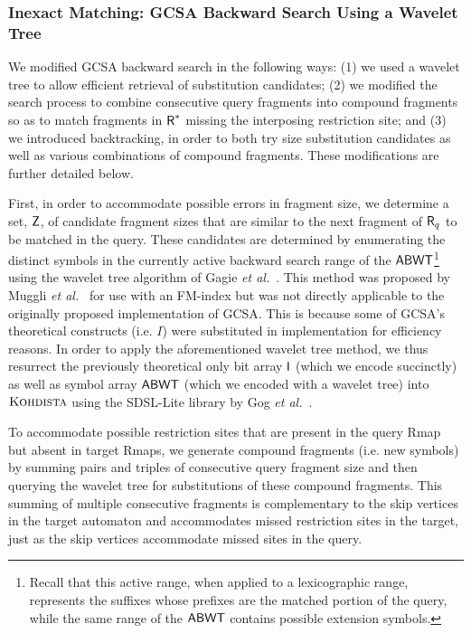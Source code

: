 \subsubsection{Inexact Matching: GCSA Backward Search Using a Wavelet Tree}



We modified GCSA backward search in the following ways:
(1) we used a wavelet tree to allow efficient retrieval of substitution candidates; (2) we modified the search process to combine consecutive query fragments into compound fragments so as to match fragments in $\mbox{\rm {\sf R}}^*$ missing the interposing restriction site; and (3) we introduced backtracking, in order to both try size substitution candidates as well as various combinations of compound fragments. These modifications are further detailed below.

First, in order to accommodate possible errors in fragment size, we determine a set, $\mathsf{Z}$, of candidate fragment sizes that are similar to the next fragment of $\mbox{\rm {\sf R}}_q$ to be matched in the query. These candidates are determined by enumerating the distinct symbols in the currently active backward search range of the $\mbox{\rm {\sf ABWT}}$\footnote{Recall that this active range, when applied to a lexicographic range, represents the suffixes whose prefixes are the matched portion of the query, while the same range of the $\mbox{\rm {\sf ABWT}}$ contains possible extension symbols.} using the wavelet tree algorithm of Gagie {\it et al.}~\cite{GNPtcs11}.  This method was proposed by Muggli {\it et al.}~\cite{wabi2014} for use with an FM-index but was not directly applicable to the originally proposed implementation of GCSA. This is because some of GCSA's theoretical constructs (i.e. $I$) were substituted in implementation for efficiency reasons.  In order to apply the aforementioned  wavelet tree method, we thus resurrect the previously theoretical only bit array $\mbox{\rm {\sf I}}$ (which we encode succinctly) as well as symbol array $\mbox{\rm {\sf ABWT}}$ (which we encoded with a wavelet tree) into $\mbox{\rm \textsc{Kohdista}}$ using the SDSL-Lite library by Gog {\it et al.}~\cite{SDSL}.

To accommodate possible restriction sites that are present in the query Rmap but absent in target Rmaps, we generate compound fragments (i.e. new symbols) by summing pairs and triples of consecutive query fragment size and then querying the wavelet tree for substitutions of these compound fragments. This summing of multiple consecutive fragments is complementary to the skip vertices in the target automaton and accommodates missed restriction sites in the target, just as the skip vertices accommodate missed sites in the query.

